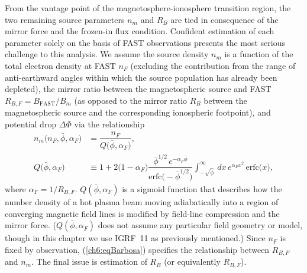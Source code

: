   From the vantage point of the magnetosphere-ionosphere transition region, the
  two remaining source parameters $n_m$ and $R_B$ are tied in consequence of
  the mirror force and the frozen-in flux condition. Confident estimation of
  each parameter solely on the basis of FAST observations presents the most
  serious challenge to this analysis. We assume the source density $n_m$ is a
  function of the total electron density at FAST $n_F$ (excluding the
  contribution from the range of anti-earthward angles within which the source
  population has already been depleted), the mirror ratio between the
  magnetospheric source and FAST $R_{B,F} = B_\textrm{FAST} / B_m$ (as opposed
  to the mirror ratio $R_B$ between the magnetospheric source and the
  corresponding ionospheric footpoint), and potential drop $\Delta \Phi$ via the
  relationship \citep{Barbosa1977}
  \begin{subequations}
    \begin{align} n_m \big ( n_F, \bar{\phi}, \alpha_F \big ) &= \dfrac{n_F}{Q \big ( \bar{\phi}, \alpha_F \big ) }, \label{ch6:eqnM} \\
      Q \big ( \bar{\phi}, \alpha_F \big ) &\equiv 1 + 2 \big ( 1 - \alpha_F
                                             \big ) \dfrac{ \bar{\phi}^{1/2} \,
                                             e^{- \alpha_F \bar{\phi}}
                                             }{\textrm{erfc} \big ( -
                                             \bar{\phi}^{1/2} \big )} {
                                             \displaystyle
                                             \int_{-\sqrt{\bar{\phi}}}^{\infty}
                                             } \, dx \, e^{\alpha_F x^2} \,
                                             \textrm{erfc} \big ( x \big
                                             ), \label{ch6:eqBarbosa}
    \end{align}
  \end{subequations}
  where $\alpha_F = 1 / R_{B,F}$. $Q (\bar{\phi}, \alpha_F)$ is a sigmoid
  function \citep[Figure 1b][]{Barbosa1977} that describes how the number
  density of a hot plasma beam moving adiabatically into a region of converging
  magnetic field lines is modified by field-line compression and the mirror
  force.  ($Q ( \bar{\phi}, \alpha_F )$ does not assume any particular field
  geometry or model, though in this chapter we use IGRF~11 as previously
  mentioned.) Since $n_F$ is fixed by observation, (\ref{ch6:eqBarbosa})
  specifies the relationship between $R_{B,F}$ and $n_m$. The final issue is
  estimation of $R_B$ (or equivalently $R_{B,F}$).

